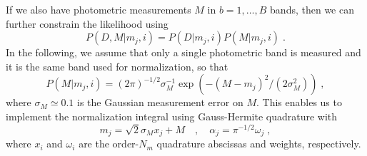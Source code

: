 \documentclass[11pt]{article}
\begin{document}
If we also have photometric measurements $M$ in $b = 1,\ldots,B$ bands, then we can further constrain the likelihood using
\begin{equation}
P(D, M|m_j, i) = P(D|m_j, i) P(M|m_j, i) \; .
\end{equation}
In the following, we assume that only a single photometric band is measured and it is the same band used for normalization, so that
\begin{equation}
P(M|m_j, i) = (2\pi)^{-1/2} \sigma_M^{-1} \exp( -(M - m_j)^2 / (2 \sigma_M^2) ) \;,
\end{equation}
where $\sigma_M \simeq 0.1$ is the Gaussian measurement error on $M$.  This enables us to implement the normalization integral using Gauss-Hermite quadrature with
\begin{equation}
m_j = \sqrt{2}\sigma_M x_j + M \quad , \quad \alpha_j = \pi^{-1/2} \omega_j \; ,
\end{equation}
where $x_i$ and $\omega_i$ are the order-$N_m$ quadrature abscissas and weights, respectively.
\end{document}
